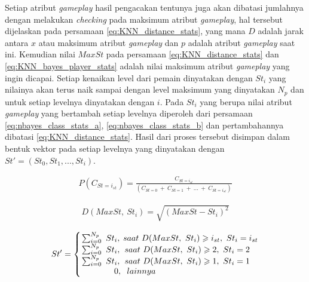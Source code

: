 Setiap atribut \textit{gameplay} hasil pengacakan tentunya juga akan dibatasi jumlahnya dengan melakukan \textit{checking} pada maksimum atribut \textit{gameplay}, hal tersebut dijelaskan pada persamaan \ref{eq:KNN_distance_stats}, yang mana $D$ adalah jarak antara $x$ atau maksimum atribut \textit{gameplay} dan $p$ adalah atribut \textit{gameplay} saat ini. Kemudian nilai $MaxSt$ pada persamaan \ref{eq:KNN_distance_stats} dan \ref{eq:KNN_bayes_player_stats} adalah nilai maksimum atribut \textit{gameplay} yang ingin dicapai. Setiap kenaikan level dari pemain dinyatakan dengan $St_{i}$ yang nilainya akan terus naik sampai dengan level maksimum yang dinyatakan $N_{p}$ dan untuk setiap levelnya dinyatakan dengan $i$. Pada $St_{i}$ yang berupa nilai atribut \textit{gameplay} yang bertambah setiap levelnya diperoleh dari persamaan \ref{eq:nbayes_class_stats_a}, \ref{eq:nbayes_class_stats_b} dan pertambahannya dibatasi \ref{eq:KNN_distance_stats}. Hasil dari proses tersebut disimpan dalam bentuk vektor pada setiap levelnya yang dinyatakan dengan $St' = \left (St_{0}, St_{1}, ..., St_{i} \right )$.
\vspace{1ex}

\begin{equation}\label{eq:nbayes_class_stats_1}
\begin{split}
P(C_{St = i_{st}}) = \frac{C_{St = i_{st}}}{(C_{St = 0}\ +\ C_{St = 1}\ +\ ...\ +\ C_{St = i_{st}})}
\end{split}
\end{equation}

\begin{equation}\label{eq:KNN_distance_stats_1}
\begin{split}
D(MaxSt,\ St_{i}) = \sqrt{(MaxSt - St_{i})^2}
\end{split}
\end{equation}

\begin{equation}\label{eq:KNN_bayes_player_stats_1}
\begin{split}
St' = \left\{\begin{matrix}
\sum_{i = 0}^{N_{p}}\ St_{i}, & \hspace{-0.7em}saat\ D(MaxSt,\ St_{i}) \geqslant i_{st},\ St_{i} = i_{st} \\
\sum_{i = 0}^{N_{p}}\ St_{i}, & \hspace{-1.5em}saat\ D(MaxSt,\ St_{i}) \geqslant 2,\ St_{i} = 2 \\
\sum_{i = 0}^{N_{p}}\ St_{i}, & \hspace{-1.5em}saat\ D(MaxSt,\ St_{i}) \geqslant 1,\ St_{i} = 1 \\
\hspace{4.0em} 0, 		  	  & \hspace{-12.5em} lainnya
\end{matrix}\right.
\end{split}
\end{equation}

